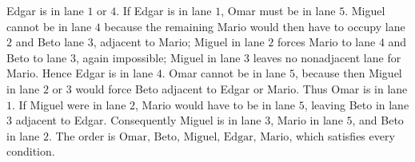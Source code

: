 Edgar is in lane $1$ or $4$. If Edgar is in lane $1$, Omar must be in lane $5$. Miguel cannot be in lane $4$ because the remaining Mario would then have to occupy lane $2$ and Beto lane $3$, adjacent to Mario; Miguel in lane $2$ forces Mario to lane $4$ and Beto to lane $3$, again impossible; Miguel in lane $3$ leaves no nonadjacent lane for Mario. Hence Edgar is in lane $4$. Omar cannot be in lane $5$, because then Miguel in lane $2$ or $3$ would force Beto adjacent to Edgar or Mario. Thus Omar is in lane $1$. If Miguel were in lane $2$, Mario would have to be in lane $5$, leaving Beto in lane $3$ adjacent to Edgar. Consequently Miguel is in lane $3$, Mario in lane $5$, and Beto in lane $2$. The order is $\boxed{\text{Omar, Beto, Miguel, Edgar, Mario}}$, which satisfies every condition.

